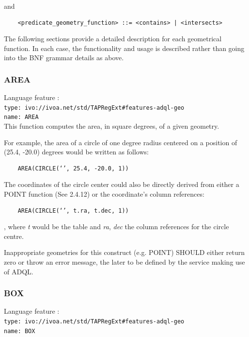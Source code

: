 \documentclass[11pt,a4paper]{ivoa}
\begin{document}
and

\begin{verbatim}
    <predicate_geometry_function> ::= <contains> | <intersects>
\end{verbatim}

\clearpage
\label{sec:geom.functions.definitions}

The following sections provide a detailed description for each geometrical
function. In each case, the functionality and usage is described rather
than going into the BNF grammar details as above.

\subsubsection{AREA}
\label{sec:geom.functions.area}
{\footnotesize Language feature :}\\
{\footnotesize \verb|type: ivo://ivoa.net/std/TAPRegExt#features-adql-geo|}\\
{\footnotesize \verb|name: AREA|}\\

This function computes the area, in square degrees, of a given geometry.

For example, the area of a circle of one degree radius centered on a position
of (25.4, -20.0) degrees would be written as follows:

\begin{verbatim}
    AREA(CIRCLE(‘’, 25.4, -20.0, 1))
\end{verbatim}

The coordinates of the circle center could also be directly derived from
either a POINT function (See 2.4.12) or the coordinate’s column references:

\begin{verbatim}
    AREA(CIRCLE(‘’, t.ra, t.dec, 1))
\end{verbatim}

, where \textit{t} would be the table and \textit{ra}, \textit{dec} the
column references for the circle centre.

Inappropriate geometries for this construct (e.g. POINT) SHOULD either return
zero or throw an error message, the later to be defined by the service making
use of ADQL.

\subsubsection{BOX}
\label{sec:geom.functions.box}
{\footnotesize Language feature :}\\
{\footnotesize \verb|type: ivo://ivoa.net/std/TAPRegExt#features-adql-geo|}\\
{\footnotesize \verb|name: BOX|}\\
\end{document}
